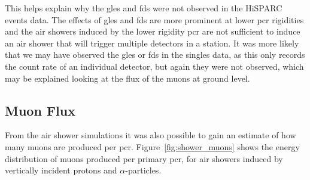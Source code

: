 This helps explain why the \glspl{gle} and \glspl{fd} were not observed in the HiSPARC events data. The effects of \glspl{gle} and \glspl{fd} are more prominent at lower \gls{pcr} rigidities and the air showers induced by the lower rigidity \gls{pcr} are not sufficient to induce an air shower that will trigger multiple detectors in a station. It was more likely that we may have observed the \glspl{gle} or \glspl{fd} in the singles data, as this only records the count rate of an individual detector, but again they were not observed, which may be explained looking at the flux of the muons at ground level.



\subsection{Muon Flux}\label{sec:CORSIKA_flux}

From the air shower simulations it was also possible to gain an estimate of how many muons are produced per \gls{pcr}. Figure~\ref{fig:shower_muons} shows the energy distribution of muons produced per primary \gls{pcr}, for air showers induced by vertically incident protons and $\alpha$-particles.

